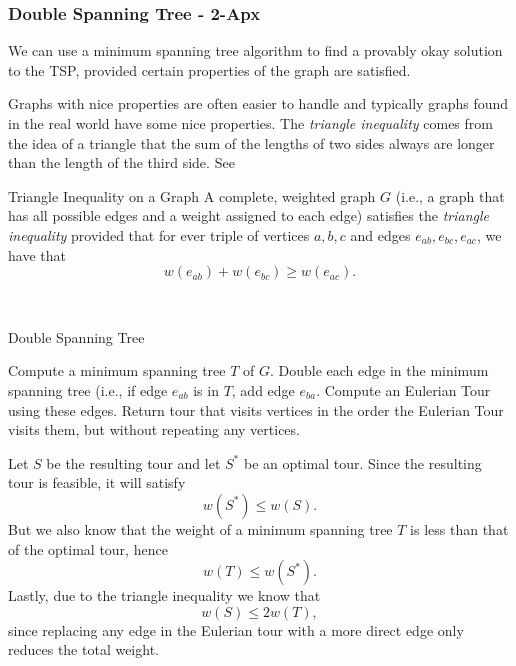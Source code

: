 \subsubsection{Double Spanning Tree - 2-Apx}
We can use a minimum spanning tree algorithm to find a provably okay solution to the TSP, provided certain properties of the graph are satisfied.  

Graphs with nice properties are often easier to handle and typically graphs found in the real world have some nice properties. The \emph{triangle inequality} comes from the idea of a triangle that the sum of the lengths of two sides always are longer than the length of the third side. See 


\begin{definition}{Triangle Inequality on a Graph}{}
A complete, weighted graph $G$ (i.e., a graph that has all possible edges and a weight assigned to each edge) satisfies the \emph{triangle inequality} provided that for ever triple of vertices $a,b,c$ and edges $e_{ab}, e_{bc}, e_{ac}$, we have that 
\[
w(e_{ab}) + w(e_{bc}) \geq w(e_{ac}).
\]
\end{definition}



\begin{algorithm}
\\
\caption{Double Spanning Tree}\label{alg:double-spanning-tree}
\begin{algorithmic}[1]
	\State Compute a minimum spanning tree $T$ of $G$.
 	\State Double each edge in the minimum spanning tree (i.e., if edge $e_{ab}$ is in $T$, add edge $e_{ba}$. 
	\State Compute an Eulerian Tour  using these edges.
	\State Return tour that visits vertices in the order the Eulerian Tour visits them, but without repeating any vertices.
	\end{algorithmic}
\end{algorithm}

Let $S$ be the resulting tour and let $S^*$ be an optimal tour.
Since the resulting tour is feasible, it will satisfy 
\[
w(S^*) \leq w(S).
\]
But we also know that the weight of a minimum spanning tree $T$ is less than that of the optimal tour, hence
\[
w(T) \leq w(S^*).
\]
Lastly, due to the triangle inequality we know that 
\[
w(S) \leq 2 w(T),
\]
since replacing any edge in the Eulerian tour with a more direct edge only reduces the total weight.

